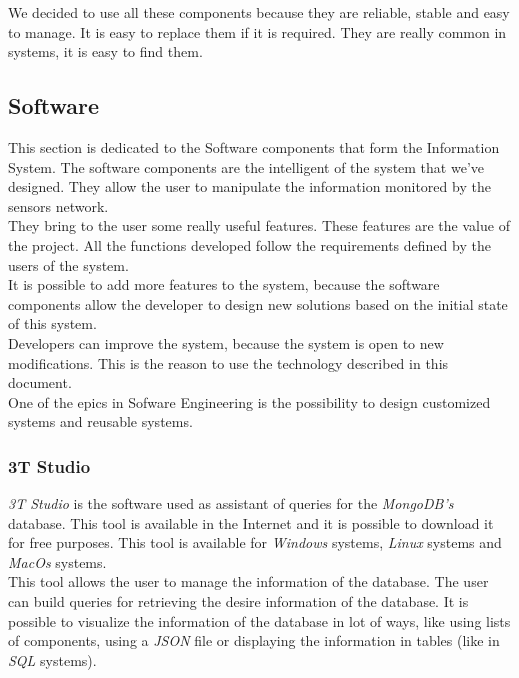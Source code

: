 We decided to use all these components because they are reliable, stable and easy to manage. It is easy to replace them if it is required. They are really common in systems, it is easy to find them.

\subsection{Software}

This section is dedicated to the Software components that form the Information System. The software components are the intelligent of the system that we've designed. They allow the user to manipulate the information monitored by the sensors network.\\

They bring to the user some really useful features. These features are the value of the project. All the functions developed follow the requirements defined by the users of the system.\\

It is possible to add more features to the system, because the software components allow the developer to design new solutions based on the initial state of this system.\\

Developers can improve the system, because the system is open to new modifications. This is the reason to use the technology described in this document.\\

One of the epics in Sofware Engineering is the possibility to design customized systems and reusable systems.

\subsubsection{3T Studio}

\textit{3T Studio} is the software used as assistant of queries for the \textit{MongoDB's} database. This tool is available in the Internet and it is possible to download it for free purposes. This tool is available for \textit{Windows} systems, \textit{Linux} systems and \textit{MacOs} systems.\\

This tool allows the user to manage the information of the database. The user can build queries for retrieving the desire information of the database. It is possible to visualize the information of the database in lot of ways, like using lists of components, using a \textit{JSON} file or displaying the information in tables (like in \textit{SQL} systems).\\

